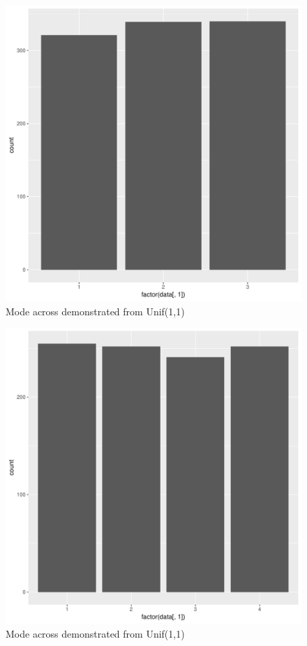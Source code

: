 \documentclass[11pt]{article}
\begin{document}
\begin{enumerate}
\begin{enumerate}
\begin{figure}[H]
	\end{figure}
	\begin{figure}[H]
		\centering
		\caption{Mode across demonstrated from Unif(1,1)}
		\includegraphics[scale=.4]{4graph.pdf}
	\end{figure}
	\begin{figure}[H]
		\centering
		\caption{Mode across demonstrated from Unif(1,1)}
		\includegraphics[scale=.4]{5graph.pdf}

\end{figure}
\end{enumerate}
\end{enumerate}
\end{document}
